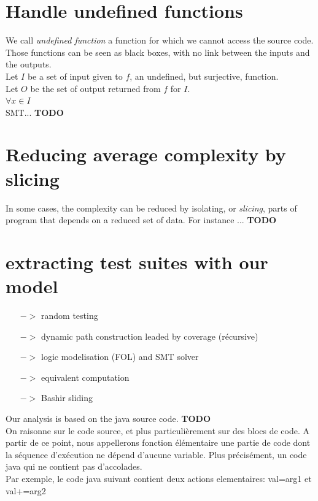 \documentclass[a4paper]{report}
\begin{document}
\section*{Handle undefined functions}
We call \textit{undefined function} a function for which we cannot access the source code. Those functions can be seen as black boxes, with no link between the inputs and the outputs.\\
Let $I$ be a set of input given to $f$, an undefined, but surjective, function.\\
Let $O$ be the set of output returned from $f$ for $I$.\\
$\forall x \in I$\\
SMT... {\color{red} \textbf{TODO}}\\

\section*{Reducing average complexity by slicing}
In some cases, the complexity can be reduced by isolating, or \textit{slicing}, parts of program that depends on a reduced set of data. For instance ...{\color{red} \textbf{TODO}}\\


\section*{extracting test suites with our model}

\begin{itemize}
\item[$->$] random testing
\item[$->$] dynamic path construction leaded by coverage (récursive)
\item[$->$] logic modelisation (FOL) and SMT solver
\item[$->$] equivalent computation
\item[$->$] Bashir sliding
\end{itemize}

Our analysis is based on the java source code. {\color{red} \textbf{TODO}}\\
On raisonne sur le code source, et plus particulièrement sur des blocs de code. A partir de ce point, nous appellerons fonction élémentaire une partie de code dont la séquence d'exécution ne dépend d'aucune variable. Plus précisément, un code java qui ne contient pas d'accolades.\\
\newline
Par exemple, le code java suivant contient deux actions elementaires: val=arg1 et val+=arg2\\
\end{document}
